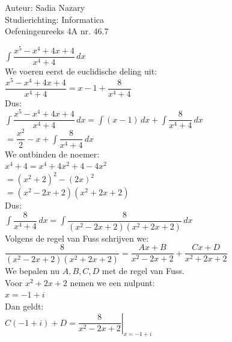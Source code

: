 \documentclass[a4paper]{article}
\newcommand{\dint}{\displaystyle\int}
\begin{document}
\noindent \large Auteur: Sadia Nazary \\
\noindent \large Studierichting: Informatica\\
\noindent \large Oefeningenreeks 4A nr. 46.7\\

\medskip

\normalsize

$\dint\dfrac{x^5-x^4+4x+4}{x^4+4}\,dx$\\

We voeren eerst de euclidische deling uit:\\

$\dfrac{x^5-x^4+4x+4}{x^4+4}
=
x-1+\dfrac{8}{x^4+4}$\\

Dus:\\

$\dint\dfrac{x^5-x^4+4x+4}{x^4+4}\,dx
=
\dint(x-1)\,dx+\dint\dfrac{8}{x^4+4}\,dx$\\

$=
\dfrac{x^2}{2}-x+\dint\dfrac{8}{x^4+4}\,dx$\\

We ontbinden de noemer:\\

$x^4+4=x^4+4x^2+4-4x^2$\\

$=(x^2+2)^2-(2x)^2$\\

$=(x^2-2x+2)(x^2+2x+2)$\\

Dus:\\

$\dint\dfrac{8}{x^4+4}\,dx
=
\dint\dfrac{8}{(x^2-2x+2)(x^2+2x+2)}\,dx$\\

Volgens de regel van Fuss schrijven we:\\

$\dfrac{8}{(x^2-2x+2)(x^2+2x+2)}
=
\dfrac{Ax+B}{x^2-2x+2}
+
\dfrac{Cx+D}{x^2+2x+2}$\\

We bepalen nu $A,B,C,D$ met de regel van Fuss.\\

Voor $x^2+2x+2$ nemen we een nulpunt:\\

$x=-1+i$\\

Dan geldt:\\

$C(-1+i)+D
=
\left.
\dfrac{8}{x^2-2x+2}
\right|_{x=-1+i}$\\
\end{document}
